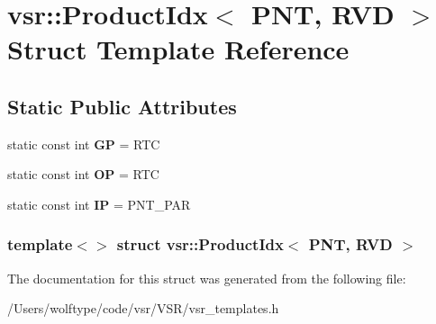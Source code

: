 \hypertarget{structvsr_1_1_product_idx_3_01_p_n_t_00_01_r_v_d_01_4}{\section{vsr\-:\-:Product\-Idx$<$ P\-N\-T, R\-V\-D $>$ Struct Template Reference}
\label{structvsr_1_1_product_idx_3_01_p_n_t_00_01_r_v_d_01_4}
}
\subsection*{Static Public Attributes}
\begin{DoxyCompactItemize}
\item 
\hypertarget{structvsr_1_1_product_idx_3_01_p_n_t_00_01_r_v_d_01_4_a6947aeef37b9ce02fd992a21b4764ee7}{static const int {\bfseries G\-P} = R\-T\-C}\label{structvsr_1_1_product_idx_3_01_p_n_t_00_01_r_v_d_01_4_a6947aeef37b9ce02fd992a21b4764ee7}

\item 
\hypertarget{structvsr_1_1_product_idx_3_01_p_n_t_00_01_r_v_d_01_4_a795e6337b136b04f8d71337f38f0fd38}{static const int {\bfseries O\-P} = R\-T\-C}\label{structvsr_1_1_product_idx_3_01_p_n_t_00_01_r_v_d_01_4_a795e6337b136b04f8d71337f38f0fd38}

\item 
\hypertarget{structvsr_1_1_product_idx_3_01_p_n_t_00_01_r_v_d_01_4_ac92dfb7625c675bdc1a581fe86f76387}{static const int {\bfseries I\-P} = P\-N\-T\-\_\-\-P\-A\-R}\label{structvsr_1_1_product_idx_3_01_p_n_t_00_01_r_v_d_01_4_ac92dfb7625c675bdc1a581fe86f76387}

\end{DoxyCompactItemize}
\subsubsection*{template$<$$>$ struct vsr\-::\-Product\-Idx$<$ P\-N\-T, R\-V\-D $>$}



The documentation for this struct was generated from the following file\-:\begin{DoxyCompactItemize}
\item 
/\-Users/wolftype/code/vsr/\-V\-S\-R/vsr\-\_\-templates.\-h\end{DoxyCompactItemize}

